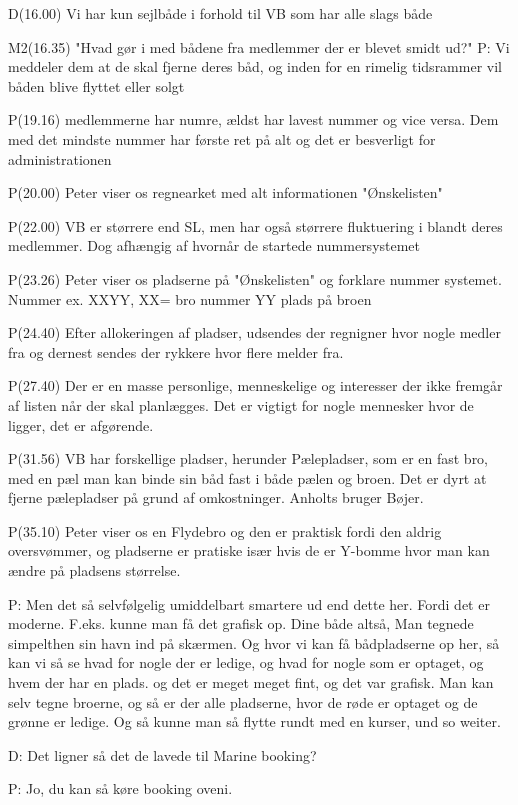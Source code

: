 D(16.00) Vi har kun sejlbåde i forhold til VB som har alle slags både

M2(16.35) "Hvad gør i med bådene fra medlemmer der er blevet smidt ud?"
P: Vi meddeler dem at de skal fjerne deres båd, og inden for en rimelig tidsrammer vil båden blive flyttet eller solgt

P(19.16) medlemmerne har numre, ældst har lavest nummer og vice versa. Dem med det mindste nummer har første ret på alt og det er besverligt for administrationen

P(20.00) Peter viser os regnearket med alt informationen "Ønskelisten"

P(22.00) VB er størrere end SL, men har også størrere fluktuering i blandt deres medlemmer. Dog afhængig af hvornår de startede nummersystemet

P(23.26) Peter viser os pladserne på "Ønskelisten" og forklare nummer systemet. Nummer ex. XXYY, XX= bro nummer YY plads på broen

P(24.40) Efter allokeringen af pladser, udsendes der regnigner hvor nogle medler fra og dernest sendes der rykkere hvor flere melder fra.

P(27.40) Der er en masse personlige, menneskelige og interesser der ikke fremgår af listen når der skal planlægges. Det er vigtigt for nogle mennesker hvor de ligger, det er afgørende.

P(31.56) VB har forskellige pladser, herunder Pælepladser, som er en fast bro, med en pæl man kan binde sin båd fast i både pælen og broen. Det er dyrt at fjerne pælepladser på grund af omkostninger. Anholts bruger Bøjer.

P(35.10) Peter viser os en Flydebro og den er praktisk fordi den aldrig oversvømmer, og pladserne er pratiske især hvis de er Y-bomme hvor man kan ændre på pladsens størrelse.

P: Men det så selvfølgelig umiddelbart smartere ud end dette her. Fordi det er moderne. F.eks. kunne man få det grafisk op. Dine både altså, Man tegnede simpelthen sin havn ind på skærmen. Og hvor vi kan få bådpladserne op her, så kan vi så se hvad for nogle der er ledige, og hvad for nogle som er optaget, og hvem der har en plads. og det er meget meget fint, og det var grafisk. Man kan selv tegne broerne, og så er der alle pladserne, hvor de røde er optaget og de grønne er ledige. Og så kunne man så flytte rundt med en kurser, und so weiter.

D: Det ligner så det de lavede til Marine booking?

P: Jo, du kan så køre booking oveni.

